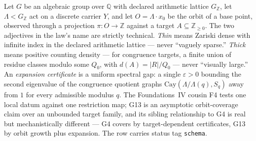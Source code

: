 \documentclass[11pt]{article}
\theoremstyle{definition}
\begin{document}
Let $G$ be an algebraic group over $\mathbb{Q}$ with declared arithmetic lattice $G_{\mathbb{Z}}$,
let $\Lambda < G_{\mathbb{Z}}$ act on a discrete carrier $Y$, and let $O = \Lambda \cdot x_0$ be the
orbit of a base point, observed through a projection $\pi : O \to \mathbb{Z}$ against a target
$A \subseteq \mathbb{Z}_{\ge 0}$. The two adjectives in the law's name are strictly technical.
\emph{Thin} means Zariski dense with infinite index in the declared arithmetic lattice --- never
``vaguely sparse.'' \emph{Thick} means positive counting density --- for congruence targets, a finite
union of residue classes modulo some $Q_0$, with $d(A) = |R|/Q_0$ --- never ``visually large.'' An
\emph{expansion certificate} is a uniform spectral gap: a single $\varepsilon > 0$ bounding the
second eigenvalue of the congruence quotient graphs $\mathrm{Cay}(\Lambda/\Lambda(q), S_q)$ away from
$1$ for every admissible modulus $q$. The Foundations~IV cousin F4 tests one local datum against one
restriction map; G13 is an asymptotic orbit-coverage claim over an unbounded target family, and its
sibling relationship to G4 is real but mechanistically different --- G4 covers by target-dependent
certificates, G13 by orbit growth plus expansion. The row carries status tag \texttt{schema}.
\end{document}
